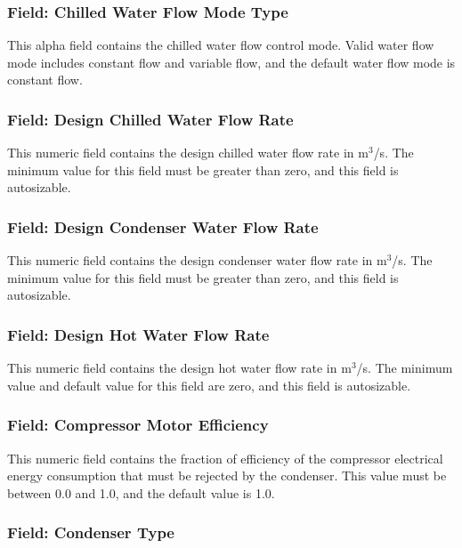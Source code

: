 \subsubsection{Field: Chilled Water Flow Mode Type}\label{field-chilled-water-flow-mode-type}

This alpha field contains the chilled water flow control mode. Valid water flow mode includes constant flow and variable flow, and the default water flow mode is constant flow.

\subsubsection{Field: Design Chilled Water Flow Rate}\label{field-design-chilled-water-flow-rate-8}

This numeric field contains the design chilled water flow rate in m\(^{3}\)/s. The minimum value for this field must be greater than zero, and this field is autosizable.

\subsubsection{Field: Design Condenser Water Flow Rate}\label{field-design-condenser-water-flow-rate-7}

This numeric field contains the design condenser water flow rate in m\(^{3}\)/s. The minimum value for this field must be greater than zero, and this field is autosizable.

\subsubsection{Field: Design Hot Water Flow Rate}\label{field-design-hot-water-flow-rate-2}

This numeric field contains the design hot water flow rate in m\(^{3}\)/s. The minimum value and default value for this field are zero, and this field is autosizable.

\subsubsection{Field: Compressor Motor Efficiency}\label{field-compressor-motor-efficiency}

This numeric field contains the fraction of efficiency of the compressor electrical energy consumption that must be rejected by the condenser. This value must be between 0.0 and 1.0, and the default value is 1.0.

\subsubsection{Field: Condenser Type}\label{field-condenser-type-7}

